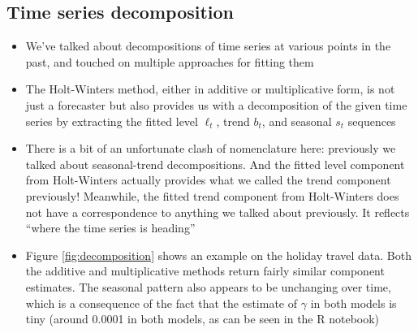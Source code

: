 \documentclass{article}
\begin{document}
\subsection{Time series decomposition}

\begin{itemize}
\item We've talked about decompositions of time series at various points in the
  past, and touched on multiple approaches for fitting them

\item The Holt-Winters method, either in additive or multiplicative form, is not
  just a forecaster but also provides us with a decomposition of the given time
  series by extracting the fitted level $\ell_t$, trend $b_t$, and seasonal
  $s_t$ sequences  

\item There is a bit of an unfortunate clash of nomenclature here: previously we
  talked about seasonal-trend decompositions. And the fitted level component
  from Holt-Winters actually provides what we called the trend component
  previously! Meanwhile, the fitted trend component from Holt-Winters does not
  have a correspondence to anything we talked about previously. It reflects
  ``where the time series is heading''    

\item Figure \ref{fig:decomposition} shows an example on the holiday travel
  data. Both the additive and multiplicative methods return fairly similar
  component estimates. The seasonal pattern also appears to be unchanging over 
  time, which is a consequence of the fact that the estimate of $\gamma$ in both
  models is tiny (around 0.0001 in both models, as can be seen in the R notebook)


\end{itemize}
\end{document}
